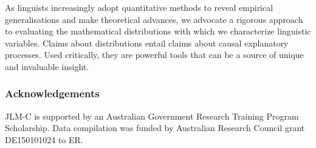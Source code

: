 As linguists increasingly adopt quantitative methods to reveal empirical generalisations and make theoretical advances, we advocate a rigorous approach to evaluating the mathematical distributions with which we characterize linguistic variables. Claims about distributions entail claims about causal explanatory processes. Used critically, they are powerful tools that can be a source of unique and invaluable insight.

\hypertarget{Acknowledgements}{%
\subsubsection{Acknowledgements}\label{Acknowledgements}}

JLM-C is supported by an Australian Government Research Training Program Scholarship. Data compilation was funded by Australian Research Council grant DE150101024 to ER.

